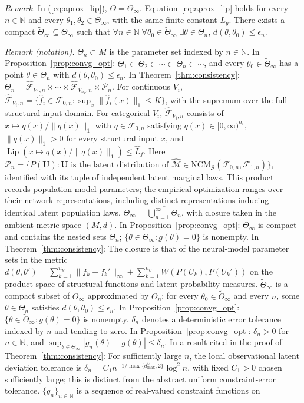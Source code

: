 \noindent\textit{Remark.} In (\ref{eq:aprox_lip}), $\Theta=\Theta_\infty$. Equation~\ref{eq:aprox_lip} holds for every $n\in\mathbb N$ and every $\theta_1,\theta_2\in\Theta_\infty$, with the same finite constant $L_g$. There exists a compact $\tilde\Theta_\infty\subseteq\Theta_\infty$ such that $\forall n\in\mathbb N\;\forall\theta_0\in\tilde\Theta_\infty\;\exists\theta\in\Theta_n$, $d(\theta,\theta_0)\leqslant\epsilon_n$.

\noindent\textit{Remark (notation).} $\Theta_n\subset M$ is the parameter set indexed by $n\in\mathbb{N}$. In Proposition~\ref{prop:convg_opt}: $\Theta_1\subset\Theta_2\subset\cdots\subset\Theta_n\subset\cdots$, and every $\theta_0\in\tilde\Theta_\infty$ has a point $\theta\in\Theta_n$ with $d(\theta,\theta_0)\leqslant\epsilon_n$. In Theorem~\ref{thm:consistency}: $\Theta_n=\hat{\mathcal F}_{V_1,n}\times\cdots\times\hat{\mathcal F}_{V_{n_V},n}\times\mathcal P_n$. For continuous $V_i$, $\hat{\mathcal F}_{V_i,n}=\{\hat f_i\in\mathcal F_{0,n}:\sup_x\|\hat f_i(x)\|_1\leqslant K\}$, with the supremum over the full structural input domain. For categorical $V_i$, $\hat{\mathcal F}_{V_i,n}$ consists of $x\mapsto q(x)/\|q(x)\|_1$ with $q\in\mathcal F_{0,n}$ satisfying $q(x)\in[0,\infty)^{n_i}$, $\|q(x)\|_1>0$ for every structural input $x$, and $\operatorname{Lip}(x\mapsto q(x)/\|q(x)\|_1)\leqslant\hat L_f$. Here $\mathcal P_n=\{P(\boldsymbol U):\boldsymbol U\text{ is the latent distribution of }\hat{\mathcal M}\in\text{NCM}_{\mathcal G}(\mathcal F_{0,n},\mathcal F_{1,n})\}$, identified with its tuple of independent latent marginal laws. This product records population model parameters; the empirical optimization ranges over their network representations, including distinct representations inducing identical latent population laws. $\Theta_\infty=\overline{\bigcup_{n=1}^{\infty}\Theta_n}$, with closure taken in the ambient metric space $(M,d)$. In Proposition~\ref{prop:convg_opt}: $\Theta_\infty$ is compact and contains the nested sets $\Theta_n$; $\{\theta\in\Theta_\infty:g(\theta)=0\}$ is nonempty. In Theorem~\ref{thm:consistency}: The closure is that of the neural-model parameter sets in the metric $d(\theta,\theta')=\sum_{k=1}^{n_V}\|f_k-f_k'\|_\infty+\sum_{k=1}^{n_U}W(P(U_k),P(U_k'))$ on the product space of structural functions and latent probability measures. $\tilde\Theta_\infty$ is a compact subset of $\Theta_\infty$ approximated by $\Theta_n$: for every $\theta_0\in\tilde\Theta_\infty$ and every $n$, some $\theta\in\Theta_n$ satisfies $d(\theta,\theta_0)\leqslant\epsilon_n$. In Proposition~\ref{prop:convg_opt}: $\{\theta\in\tilde\Theta_\infty:g(\theta)=0\}$ is nonempty. $\delta_n$ denotes a deterministic error tolerance indexed by $n$ and tending to zero. In Proposition~\ref{prop:convg_opt}: $\delta_n>0$ for $n\in\mathbb N$, and $\sup_{\theta\in\Theta_\infty}|g_n(\theta)-g(\theta)|\leqslant\delta_n$. In a result cited in the proof of Theorem~\ref{thm:consistency}: For sufficiently large $n$, the local observational latent deviation tolerance is $\delta_n=C_1n^{-1/\max\{d_{\max}^U,2\}}\log^2 n$, with fixed $C_1>0$ chosen sufficiently large; this is distinct from the abstract uniform constraint-error tolerance. $\{g_n\}_{n\in\mathbb{N}}$ is a sequence of real-valued constraint functions on 